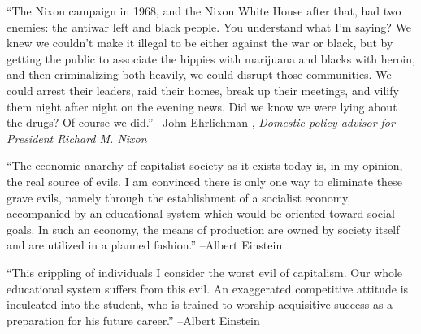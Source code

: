 \documentclass{article}%
\begin{document}
\begin{minipage}{\textwidth}%
\flushleft%
“The Nixon campaign in 1968, and the Nixon White House after that, had two enemies: the antiwar left and black people. You understand what I'm saying? We knew we couldn't make it illegal to be either against the war or black, but by getting the public to associate the hippies with marijuana and blacks with heroin, and then criminalizing both heavily, we could disrupt those communities. We could arrest their leaders, raid their homes, break up their meetings, and vilify them night after night on the evening news. Did we know we were lying about the drugs? Of course we did.”%
\linebreak%
\vspace{1mm}%
–John Ehrlichman%
, \textit{Domestic policy advisor for President Richard M. Nixon}%
\linebreak%
\vspace{1mm}%
\end{minipage}%
\linebreak%
\vspace{1mm}%
\begin{minipage}{\textwidth}%
\flushleft%
“The economic anarchy of capitalist society as it exists today is, in my opinion, the real source of evils. I am convinced there is only one way to eliminate these grave evils, namely through the establishment of a socialist economy, accompanied by an educational system which would be oriented toward social goals. In such an economy, the means of production are owned by society itself and are utilized in a planned fashion.”%
\linebreak%
\vspace{1mm}%
–Albert Einstein%
\linebreak%
\vspace{1mm}%
\end{minipage}%
\linebreak%
\vspace{1mm}%
\begin{minipage}{\textwidth}%
\flushleft%
“This crippling of individuals I consider the worst evil of capitalism. Our whole educational system suffers from this evil. An exaggerated competitive attitude is inculcated into the student, who is trained to worship acquisitive success as a preparation for his future career.”%
\linebreak%
\vspace{1mm}%
–Albert Einstein%
\linebreak%
\vspace{1mm}%
\end{minipage}%
\end{document}
